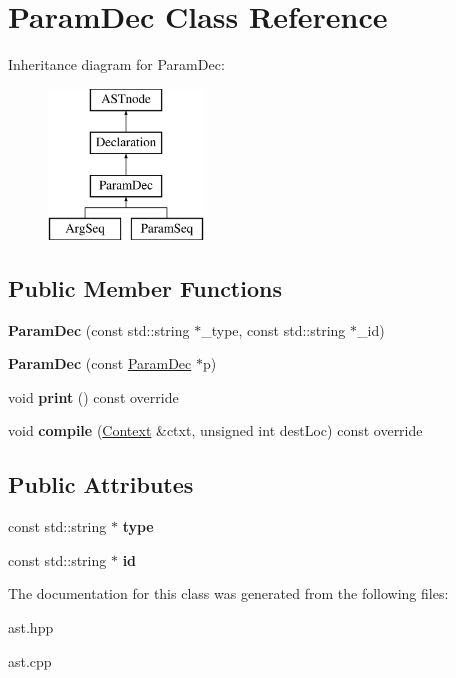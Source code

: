 \hypertarget{class_param_dec}{}\section{Param\+Dec Class Reference}
\label{class_param_dec}
Inheritance diagram for Param\+Dec\+:\begin{figure}[H]
\begin{center}
\leavevmode
\includegraphics[height=4.000000cm]{class_param_dec}
\end{center}
\end{figure}
\subsection*{Public Member Functions}
\begin{DoxyCompactItemize}
\item 
\mbox{\label{class_param_dec_a59a780182ef445ee791549918c5b5f04}} 
{\bfseries Param\+Dec} (const std\+::string $\ast$\+\_\+type, const std\+::string $\ast$\+\_\+id)
\item 
\mbox{\label{class_param_dec_a0162a8316dc39022f906104a14e990cd}} 
{\bfseries Param\+Dec} (const \hyperlink{class_param_dec}{Param\+Dec} $\ast$p)
\item 
\mbox{\label{class_param_dec_af2a5cf5fdd909c1c997ef54a55338375}} 
void {\bfseries print} () const override
\item 
\mbox{\label{class_param_dec_a85676e857de493242fad995d165f190f}} 
void {\bfseries compile} (\hyperlink{class_context}{Context} \&ctxt, unsigned int dest\+Loc) const override
\end{DoxyCompactItemize}
\subsection*{Public Attributes}
\begin{DoxyCompactItemize}
\item 
\mbox{\label{class_param_dec_a0a806710417048c81c274d4271e737e2}} 
const std\+::string $\ast$ {\bfseries type}
\item 
\mbox{\label{class_param_dec_a1fc979a07268fc208317f47fb7fbacf3}} 
const std\+::string $\ast$ {\bfseries id}
\end{DoxyCompactItemize}


The documentation for this class was generated from the following files\+:\begin{DoxyCompactItemize}
\item 
ast.\+hpp\item 
ast.\+cpp\end{DoxyCompactItemize}
